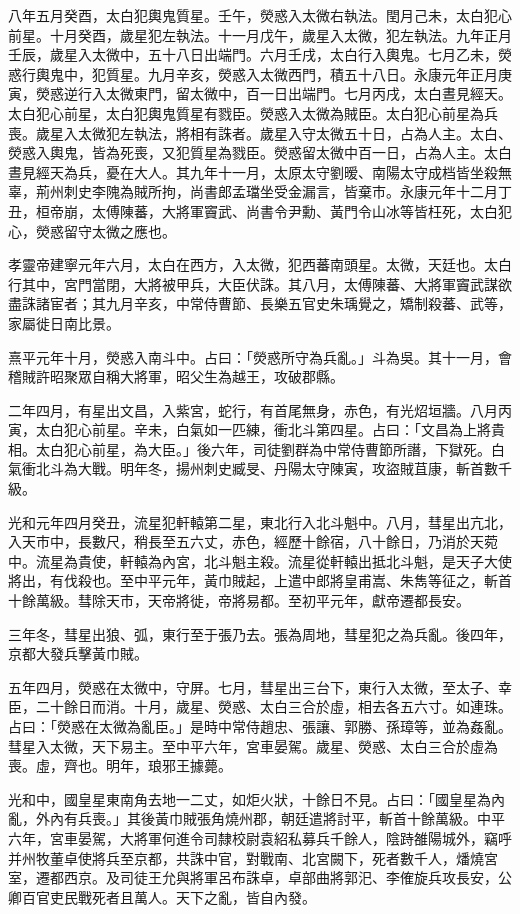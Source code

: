 \begin{pinyinscope}
八年五月癸酉，太白犯輿鬼質星。壬午，熒惑入太微右執法。閏月己未，太白犯心前星。十月癸酉，歲星犯左執法。十一月戊午，歲星入太微，犯左執法。九年正月壬辰，歲星入太微中，五十八日出端門。六月壬戌，太白行入輿鬼。七月乙未，熒惑行輿鬼中，犯質星。九月辛亥，熒惑入太微西門，積五十八日。永康元年正月庚寅，熒惑逆行入太微東門，留太微中，百一日出端門。七月丙戌，太白晝見經天。太白犯心前星，太白犯輿鬼質星有戮臣。熒惑入太微為賊臣。太白犯心前星為兵喪。歲星入太微犯左執法，將相有誅者。歲星入守太微五十日，占為人主。太白、熒惑入輿鬼，皆為死喪，又犯質星為戮臣。熒惑留太微中百一日，占為人主。太白晝見經天為兵，憂在大人。其九年十一月，太原太守劉暧、南陽太守成档皆坐殺無辜，荊州刺史李隗為賊所拘，尚書郎孟璫坐受金漏言，皆棄巿。永康元年十二月丁丑，桓帝崩，太傅陳蕃，大將軍竇武、尚書令尹勳、黃門令山冰等皆枉死，太白犯心，熒惑留守太微之應也。

孝靈帝建寧元年六月，太白在西方，入太微，犯西蕃南頭星。太微，天廷也。太白行其中，宮門當閉，大將被甲兵，大臣伏誅。其八月，太傅陳蕃、大將軍竇武謀欲盡誅諸宦者；其九月辛亥，中常侍曹節、長樂五官史朱瑀覺之，矯制殺蕃、武等，家屬徙日南比景。

熹平元年十月，熒惑入南斗中。占曰：「熒惑所守為兵亂。」斗為吳。其十一月，會稽賊許昭聚眾自稱大將軍，昭父生為越王，攻破郡縣。

二年四月，有星出文昌，入紫宮，蛇行，有首尾無身，赤色，有光炤垣牆。八月丙寅，太白犯心前星。辛未，白氣如一匹練，衝北斗第四星。占曰：「文昌為上將貴相。太白犯心前星，為大臣。」後六年，司徒劉群為中常侍曹節所譖，下獄死。白氣衝北斗為大戰。明年冬，揚州刺史臧旻、丹陽太守陳寅，攻盜賊苴康，斬首數千級。

光和元年四月癸丑，流星犯軒轅第二星，東北行入北斗魁中。八月，彗星出亢北，入天巿中，長數尺，稍長至五六丈，赤色，經歷十餘宿，八十餘日，乃消於天菀中。流星為貴使，軒轅為內宮，北斗魁主殺。流星從軒轅出抵北斗魁，是天子大使將出，有伐殺也。至中平元年，黃巾賊起，上遣中郎將皇甫嵩、朱雋等征之，斬首十餘萬級。彗除天巿，天帝將徙，帝將易都。至初平元年，獻帝遷都長安。

三年冬，彗星出狼、弧，東行至于張乃去。張為周地，彗星犯之為兵亂。後四年，京都大發兵擊黃巾賊。

五年四月，熒惑在太微中，守屏。七月，彗星出三台下，東行入太微，至太子、幸臣，二十餘日而消。十月，歲星、熒惑、太白三合於虛，相去各五六寸。如連珠。占曰：「熒惑在太微為亂臣。」是時中常侍趙忠、張讓、郭勝、孫璋等，並為姦亂。彗星入太微，天下易主。至中平六年，宮車晏駕。歲星、熒惑、太白三合於虛為喪。虛，齊也。明年，琅邪王據薨。

光和中，國皇星東南角去地一二丈，如炬火狀，十餘日不見。占曰：「國皇星為內亂，外內有兵喪。」其後黃巾賊張角燒州郡，朝廷遣將討平，斬首十餘萬級。中平六年，宮車晏駕，大將軍何進令司隸校尉袁紹私募兵千餘人，陰跱雒陽城外，竊呼并州牧董卓使將兵至京都，共誅中官，對戰南、北宮闕下，死者數千人，燔燒宮室，遷都西京。及司徒王允與將軍呂布誅卓，卓部曲將郭汜、李傕旋兵攻長安，公卿百官吏民戰死者且萬人。天下之亂，皆自內發。


\end{pinyinscope}

